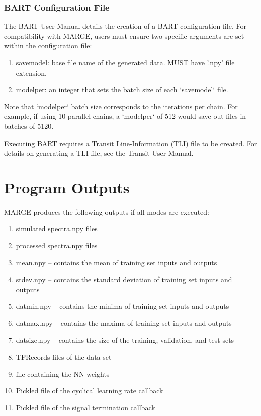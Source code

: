 \documentclass[letterpaper, 12pt]{article}
\begin{document}
\subsubsection{BART Configuration File}
\label{sec:BARTconfig}

The BART User Manual details the creation of a BART configuration file.  For 
compatibility with MARGE, users must ensure two specific arguments are set 
within the configuration file:
\begin{enumerate}
\item savemodel: base file name of the generated data. MUST have '.npy' file 
                 extension.
\item modelper: an integer that sets the batch size of each `savemodel` file.
\end{enumerate}

\noindent Note that `modelper` batch size corresponds to the iterations per 
chain.  For example, if using 10 parallel chains, a `modelper` of 512 would 
save out files in batches of 5120.

\noindent  Executing BART requires a Transit Line-Information (TLI) file to 
be created.  For details on generating a TLI file, see the Transit User Manual.



\section{Program Outputs}
\label{sec:outputs}

MARGE produces the following outputs if all modes are executed:

\begin{enumerate}
\item simulated spectra.npy files
\item processed spectra.npy files
\item mean.npy -- contains the mean of training set inputs and outputs
\item stdev.npy -- contains the standard deviation of training set inputs and 
                   outputs
\item datmin.npy -- contains the minima of training set inputs and outputs
\item datmax.npy -- contains the maxima of training set inputs and outputs
\item datsize.npy -- contains the size of the training, validation, and test 
                     sets
\item TFRecords files of the data set
\item file containing the NN weights
\item Pickled file of the cyclical learning rate callback
\item Pickled file of the signal termination callback
\end{enumerate}
\end{document}
